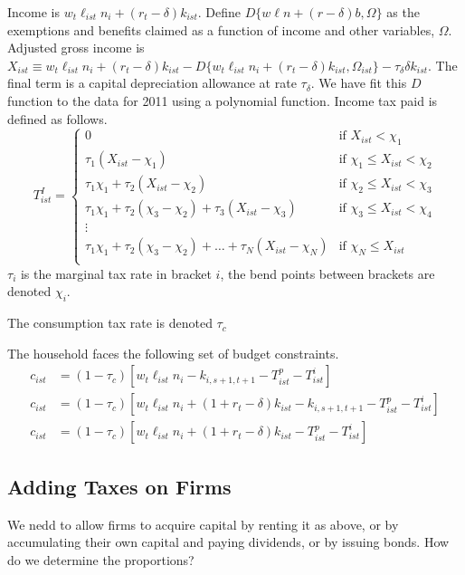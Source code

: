 \documentclass[letterpaper,12pt]{article}
\theoremstyle{definition}
\numberwithin{equation}{section}
\begin{document}
\begin{spacing}{1.5}
    Income is $w_t \ell_{ist} n_i + (r_t-\delta) k_{ist}$.  Define $D\{w\ell n+(r-\delta)b,\Omega\}$ as the exemptions and benefits claimed as a function of income and other variables, $\Omega$.  Adjusted gross income is $X_{ist} \equiv w_t \ell_{ist} n_i + (r_t-\delta) k_{ist} - D\{w_t \ell_{ist} n_i + (r_t-\delta) k_{ist},\Omega_{ist}\} -\tau_\delta \delta k_{ist}$.  The final term is a capital depreciation allowance at rate $\tau_\delta$.  We have fit this $D$ function to the data for 2011 using a polynomial function.  Income tax paid is defined as follows.
    \begin{equation}\label{Macro_HHTax_IncomeTax}
    T^I_{ist} = \left\{ \begin{matrix} 0 & \text{if } X_{ist} < \chi_1 \\
                \tau_1 (X_{ist} - \chi_1) & \text{if }  \chi_1 \le X_{ist} < \chi_2 \\
                \tau_1 \chi_1 + \tau_2 (X_{ist} - \chi_2) & \text{if }  \chi_2 \le X_{ist} < \chi_3 \\
                \tau_1 \chi_1 + \tau_2 (\chi_3 - \chi_2) + \tau_3 (X_{ist} - \chi_3) & \text{if }  \chi_3 \le X_{ist} < \chi_4 \\
                \vdots \\
                \tau_1 \chi_1 + \tau_2 (\chi_3 - \chi_2) +\dots+ \tau_N (X_{ist} - \chi_N) & \text{if }  \chi_N \le X_{ist} \\
                \end{matrix} \right.
    \end{equation}
    $\tau_i$ is the marginal tax rate in bracket $i$, the bend points between brackets are denoted $\chi_i$.

    The consumption tax rate is denoted $\tau_c$

    The household faces the following set of budget constraints.
    \begin{align}
    c_{ist} & = (1-\tau_c)\left[w_t \ell_{ist} n_i - k_{i,s+1,t+1} - T^p_{ist} - T^i_{ist} \right] \label{Macro_HHTax_BC1}\\
    c_{ist} & = (1-\tau_c)\left[w_t \ell_{ist} n_i + (1+r_t-\delta) k_{ist} - k_{i,s+1,t+1} - T^p_{ist} - T^i_{ist} \right] \label{Macro_HHTax_BC2}\\
    c_{ist} & = (1-\tau_c)\left[w_t \ell_{ist} n_i + (1+r_t-\delta) k_{ist} - T^p_{ist} - T^i_{ist} \right] \label{Macro_HHTax_BC3}
    \end{align}

  \subsection{Adding Taxes on Firms}\label{SubSec_Macro_CorpTax}
    We nedd to allow firms to acquire capital by renting it as above, or by accumulating their own capital and paying dividends, or by issuing bonds.  How do we determine the proportions?


\end{spacing}
\end{document}
